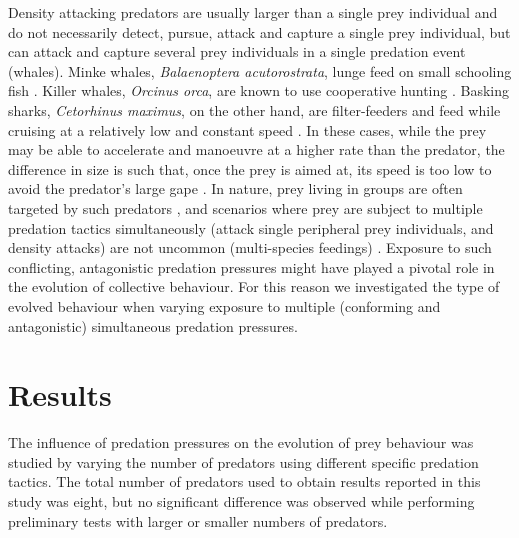 Density attacking predators are usually larger than a single prey individual and do not necessarily detect, pursue, attack and capture a single prey individual, but can attack and capture several prey individuals in a single predation event (\eg whales). Minke whales, \emph{Balaenoptera acutorostrata}, lunge feed on small schooling fish \cite{hoelzel1989foraging}. Killer whales, \emph{Orcinus orca}, are known to use cooperative hunting \cite{domenici2000killer,nottestad1999herring}. Basking sharks, \emph{Cetorhinus maximus}, on the other hand, are filter-feeders and feed while cruising at a relatively low and constant speed \cite{sims2000filterfeeding}. In these cases, while the prey may be able to accelerate and manoeuvre at a higher rate than the predator, the difference in size is such that, once the prey is aimed at, its speed is too low to avoid the predator's large gape \cite{domenici2001scaling}. In nature, prey living in groups are often targeted by such predators \cite{domenici2001scaling,goldbogen2011mechanics,nottestad1999herring,nottestad2002whales}, and scenarios where prey are subject to multiple predation tactics simultaneously (\eg attack single peripheral prey individuals, and density attacks) are not uncommon (\eg multi-species feedings) \cite{haynes2013molecular,mori2006first,thiebault2015howto}. Exposure to such conflicting, antagonistic predation pressures might have played a pivotal role in the evolution of collective behaviour. For this reason we investigated the type of evolved behaviour when varying exposure to multiple (conforming and antagonistic) simultaneous predation pressures.

\section{Results}

The influence of predation pressures on the evolution of prey behaviour was studied by varying the number of predators using different specific predation tactics. The total number of predators used to obtain results reported in this study was eight, but no significant difference was observed while performing preliminary tests with larger or smaller numbers of predators.


